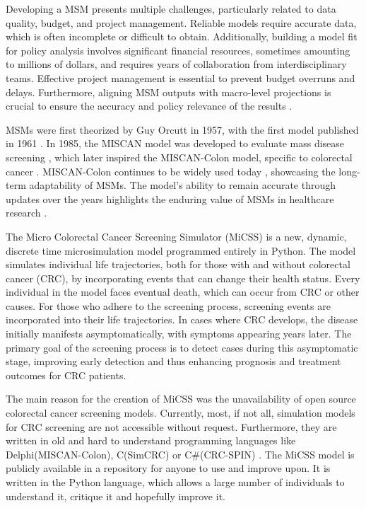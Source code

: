 \documentclass[sn-mathphys-num]{sn-jnl}%
\theoremstyle{thmstyleone}%
\theoremstyle{thmstyletwo}%
\theoremstyle{thmstylethree}%
\begin{document}
Developing a MSM presents multiple challenges, particularly related to data quality, budget, and project management. Reliable models require accurate data, which is often incomplete or difficult to obtain. Additionally, building a model fit for policy analysis involves significant financial resources, sometimes amounting to millions of dollars, and requires years of collaboration from interdisciplinary teams. Effective project management is essential to prevent budget overruns and delays. Furthermore, aligning MSM outputs with macro-level projections is crucial to ensure the accuracy and policy relevance of the results \cite{harding_challenges_2023}.

MSMs were first theorized by Guy Orcutt in 1957, with the first model published in 1961 \cite{orcutt_new_1957, orcutt_microanalysis_1963}. In 1985, the MISCAN model was developed to evaluate mass disease screening \cite{habbema_miscan_1985}, which later inspired the MISCAN-Colon model, specific to colorectal cancer \cite{loeve_miscan-colon_1999}. MISCAN-Colon continues to be widely used today \cite{van_den_puttelaar_effectiveness_2024}, showcasing the long-term adaptability of MSMs. The model’s ability to remain accurate through updates over the years highlights the enduring value of MSMs in healthcare research \cite{gini_development_2021}.

The Micro Colorectal Cancer Screening Simulator (MiCSS) is a new, dynamic, discrete time microsimulation model programmed entirely in Python. The model simulates individual life trajectories, both for those with and without colorectal cancer (CRC), by incorporating events that can change their health status. Every individual in the model faces eventual death, which can occur from CRC or other causes. For those who adhere to the screening process, screening events are incorporated into their life trajectories. In cases where CRC develops, the disease initially manifests asymptomatically, with symptoms appearing years later. The primary goal of the screening process is to detect cases during this asymptomatic stage, improving early detection and thus enhancing prognosis and treatment outcomes for CRC patients.

The main reason for the creation of MiCSS was the unavailability of open source colorectal cancer screening models. Currently, most, if not all, simulation models for CRC screening are not accessible without request. Furthermore, they are written in old and hard to understand programming languages like Delphi(MISCAN-Colon), C(SimCRC) or C\#(CRC-SPIN) \cite{noauthor_miscan-colon_nodate,noauthor_simcrc_nodate, noauthor_crc-spin_nodate}. The MiCSS model is publicly available in a repository for anyone to use and improve upon. It is written in the Python language, which allows a large number of individuals to understand it, critique it and hopefully improve it.
\end{document}
